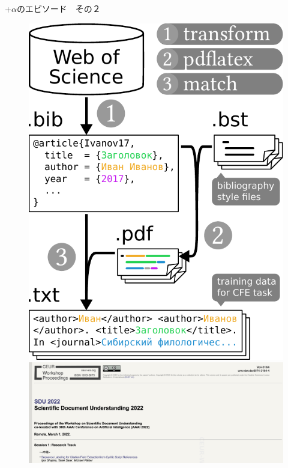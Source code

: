 \documentclass[lualatex,aspectratio=169]{beamer}
\begin{document}
\begin{frame}[t]{+$\alpha$のエピソード　その２}
\begin{figure}
\begin{overprint}
            \begin{center}\includegraphics[height=0.45\textheight]{./img/cyr_ppr_2_2.pdf}\end{center}
            \begin{center}\includegraphics[height=0.45\textheight]{./img/cyr_ppr_2_1.png}\end{center}

\end{overprint}
\end{figure}
\end{frame}
\end{document}
